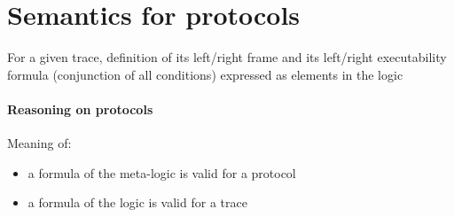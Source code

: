 \section{Semantics for protocols}

For a given trace, definition of its left/right frame and its left/right executability formula (conjunction of all conditions) expressed as elements in the logic

%
%

\paragraph{Reasoning on protocols}

Meaning of:
\begin{itemize}
  \item a formula of the meta-logic is valid for a protocol
  \item a formula of the logic is valid for a trace
\end{itemize}

